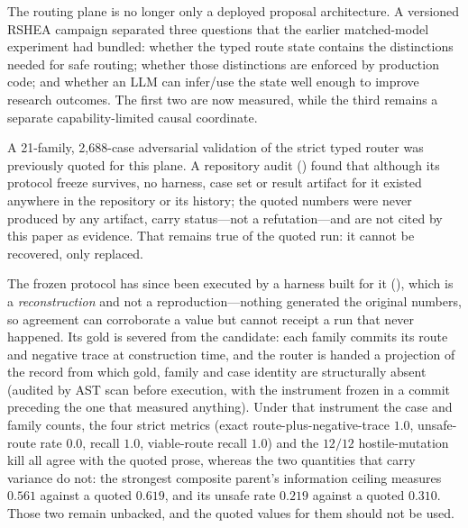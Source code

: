 The routing plane is no longer only a deployed proposal architecture.  A versioned RSHEA campaign separated three questions that the earlier matched-model experiment had bundled: whether the typed route state contains the distinctions needed for safe routing; whether those distinctions are enforced by production code; and whether an LLM can infer/use the state well enough to improve research outcomes.  The first two are now measured, while the third remains a separate capability-limited causal coordinate.

A 21-family, 2,688-case adversarial validation of the strict typed router was previously quoted for this plane.  A repository audit () found that although its protocol freeze survives, no harness, case set or result artifact for it existed anywhere in the repository or its history; the quoted numbers were never produced by any artifact, carry \CANNOTCHECK{} status---not a refutation---and are not cited by this paper as evidence.  That remains true of the quoted run: it cannot be recovered, only replaced.

The frozen protocol has since been executed by a harness built for it (), which is a \emph{reconstruction} and not a reproduction---nothing generated the original numbers, so agreement can corroborate a value but cannot receipt a run that never happened.  Its gold is severed from the candidate: each family commits its route and negative trace at construction time, and the router is handed a projection of the record from which gold, family and case identity are structurally absent (audited by AST scan before execution, with the instrument frozen in a commit preceding the one that measured anything).  Under that instrument the case and family counts, the four strict metrics (exact route-plus-negative-trace $1.0$, unsafe-route rate $0.0$, \CANNOTCHECK{} recall $1.0$, viable-route recall $1.0$) and the $12/12$ hostile-mutation kill all agree with the quoted prose, whereas the two quantities that carry variance do not: the strongest composite parent's information ceiling measures $0.561$ against a quoted $0.619$, and its unsafe rate $0.219$ against a quoted $0.310$.  Those two remain unbacked, and the quoted values for them should not be used.

